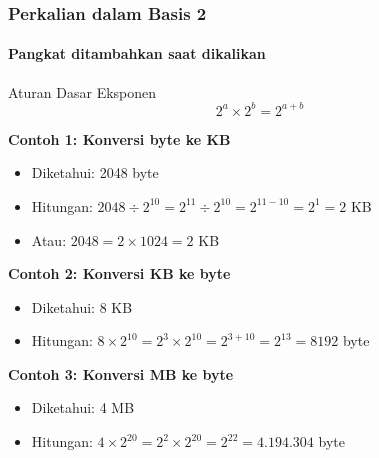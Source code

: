 \documentclass[t,aspectratio=169,xcolor=dvipsnames]{beamer}
\begin{document}
\begin{frame}
    \frametitle{Perkalian dalam Basis 2}
    \framesubtitle{Pangkat ditambahkan saat dikalikan}
    \scriptsize

    \begin{block}{Aturan Dasar Eksponen}
        \[
        2^a \times 2^b = 2^{a+b}
        \]
    \end{block}

    \vspace{0.2cm}
    \textbf{Contoh 1: Konversi byte ke KB}
    \begin{itemize}
        \item Diketahui: 2048 byte
        \item Hitungan: $2048 \div 2^{10} = 2^{11} \div 2^{10} = 2^{11-10} = 2^1 = 2$ KB
        \item Atau: $2048 = 2 \times 1024 = 2$ KB
    \end{itemize}

    \vspace{0.2cm}
    \textbf{Contoh 2: Konversi KB ke byte}
    \begin{itemize}
        \item Diketahui: 8 KB
        \item Hitungan: $8 \times 2^{10} = 2^3 \times 2^{10} = 2^{3+10} = 2^{13} = 8192$ byte
    \end{itemize}

    \vspace{0.2cm}
    \textbf{Contoh 3: Konversi MB ke byte}
    \begin{itemize}
        \item Diketahui: 4 MB
        \item Hitungan: $4 \times 2^{20} = 2^2 \times 2^{20} = 2^{22} = 4.194.304$ byte
    \end{itemize}
\end{frame}
\end{document}
